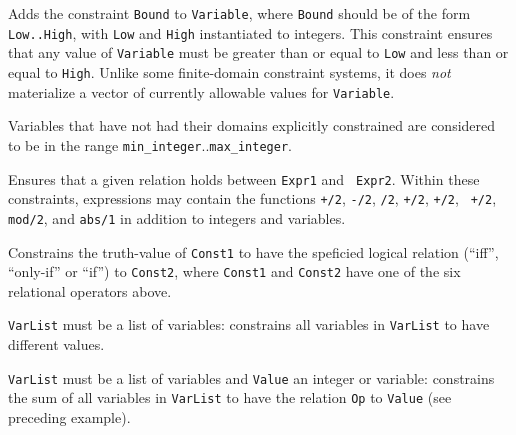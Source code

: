 \begin{description}

%
Adds the constraint {\tt Bound} to {\tt Variable}, where {\tt Bound}
should be of the form {\tt Low..High}, with {\tt Low} and {\tt High}
instantiated to integers.  This constraint ensures that any value of
{\tt Variable} must be greater than or equal to {\tt Low} and less
than or equal to {\tt High}.  Unlike some finite-domain constraint
systems, it does {\em not} materialize a vector of currently allowable
values for {\tt Variable}.

Variables that have not had their domains explicitly constrained are
considered to be in the range {\tt min\_integer}..{\tt max\_integer}.


%
Ensures that a given relation holds between {\tt Expr1} and {\tt
  Expr2}.  Within these constraints, expressions may contain the
functions {\tt +/2}, {\tt -/2}, {\tt */2}, {\tt +/2}, {\tt +/2}, {\tt
  +/2}, {\tt mod/2}, and {\tt abs/1} in addition to integers and
variables.

%
Constrains the truth-value of {\tt Const1} to have the speficied
logical relation (``iff'', ``only-if'' or ``if'') to {\tt Const2},
where {\tt Const1} and {\tt Const2} have one of the six relational
operators above.  

%
{\tt VarList} must be a list of variables: constrains all variables in
{\tt VarList} to have different values.

%
{\tt VarList} must be a list of variables and {\tt Value} an integer
or variable: constrains the sum of all variables in {\tt VarList} to
have the relation {\tt Op} to {\tt Value} (see preceding example).


\end{description}
